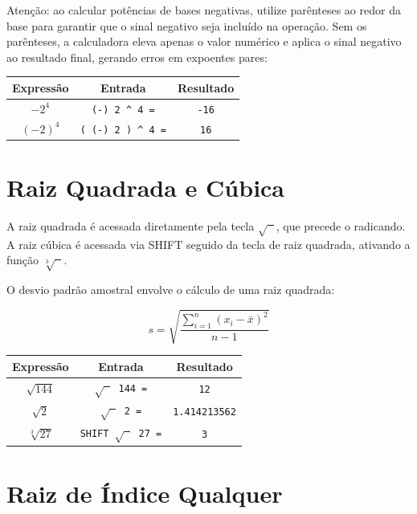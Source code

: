 Atenção: ao calcular potências de bases negativas, utilize parênteses ao redor da base para garantir que o sinal negativo seja incluído na operação. Sem os parênteses, a calculadora eleva apenas o valor numérico e aplica o sinal negativo ao resultado final, gerando erros em expoentes pares:

\begin{center}
\begin{tabular}{|c|c|c|}
    \hline
    \textbf{Expressão} & \textbf{Entrada} & \textbf{Resultado} \\
    \hline
    $-2^4$ & \texttt{(-) 2 \^{} 4 =} & \texttt{-16} \\
    $(-2)^4$ & \texttt{( (-) 2 ) \^{} 4 =} & \texttt{16} \\
    \hline
\end{tabular}
\end{center}

\section{Raiz Quadrada e Cúbica}

A raiz quadrada é acessada diretamente pela tecla \textbf{$\sqrt{\phantom{x}}$}, que precede o radicando. A raiz cúbica é acessada via SHIFT seguido da tecla de raiz quadrada, ativando a função \textbf{$\sqrt[3]{\phantom{x}}$}.

O desvio padrão amostral envolve o cálculo de uma raiz quadrada:

\[
    s = \sqrt{\frac{\sum_{i=1}^{n}(x_i - \bar{x})^2}{n-1}}
\]

\begin{center}
\begin{tabular}{|c|c|c|}
    \hline
    \textbf{Expressão} & \textbf{Entrada} & \textbf{Resultado} \\
    \hline
    $\sqrt{144}$ & \texttt{$\sqrt{\phantom{x}}$ 144 =} & \texttt{12} \\
    $\sqrt{2}$ & \texttt{$\sqrt{\phantom{x}}$ 2 =} & \texttt{1.414213562} \\
    $\sqrt[3]{27}$ & \texttt{SHIFT $\sqrt{\phantom{x}}$ 27 =} & \texttt{3} \\
    \hline
\end{tabular}
\end{center}

\section{Raiz de Índice Qualquer}

